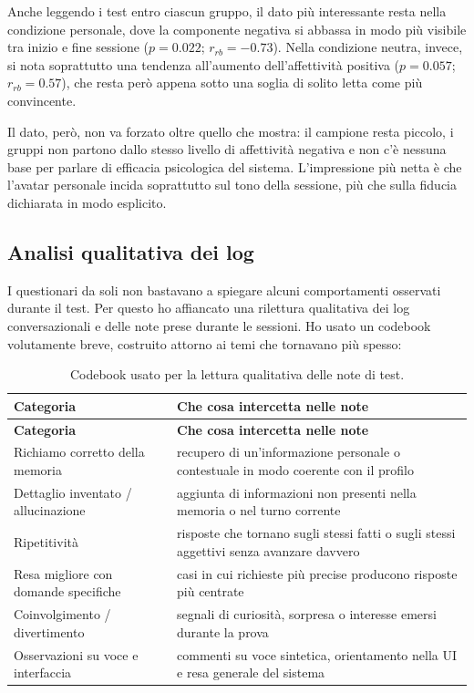 Anche leggendo i test entro ciascun gruppo, il dato più interessante resta nella condizione personale, dove la componente negativa si abbassa in modo più visibile tra inizio e fine sessione ($p = 0.022$; $r_{rb} = -0.73$). Nella condizione neutra, invece, si nota soprattutto una tendenza all'aumento dell'affettività positiva ($p = 0.057$; $r_{rb} = 0.57$), che resta però appena sotto una soglia di solito letta come più convincente.

Il dato, però, non va forzato oltre quello che mostra: il campione resta piccolo, i gruppi non partono dallo stesso livello di affettività negativa e non c'è nessuna base per parlare di efficacia psicologica del sistema. L'impressione più netta è che l'avatar personale incida soprattutto sul tono della sessione, più che sulla fiducia dichiarata in modo esplicito.

\subsection{Analisi qualitativa dei log}
\label{subsec:qualitative-logs}

I questionari da soli non bastavano a spiegare alcuni comportamenti osservati durante il test. Per questo ho affiancato una rilettura qualitativa dei log conversazionali e delle note prese durante le sessioni. Ho usato un codebook volutamente breve, costruito attorno ai temi che tornavano più spesso:

\begingroup
\small
\setlength{\tabcolsep}{6pt}
\renewcommand{\arraystretch}{1.05}
\begin{longtable}{>{\raggedright\arraybackslash}p{}>{\raggedright\arraybackslash}p{}}
\caption{Codebook usato per la lettura qualitativa delle note di test.}
\label{tab:qualitative-codebook}\\
\hline
\textbf{Categoria} & \textbf{Che cosa intercetta nelle note} \\
\hline
\endfirsthead
\hline
\textbf{Categoria} & \textbf{Che cosa intercetta nelle note} \\
\hline
\endhead
\hline
\endfoot
Richiamo corretto della memoria & recupero di un'informazione personale o contestuale in modo coerente con il profilo \\
Dettaglio inventato / allucinazione & aggiunta di informazioni non presenti nella memoria o nel turno corrente \\
Ripetitività & risposte che tornano sugli stessi fatti o sugli stessi aggettivi senza avanzare davvero \\
Resa migliore con domande specifiche & casi in cui richieste più precise producono risposte più centrate \\
Coinvolgimento / divertimento & segnali di curiosità, sorpresa o interesse emersi durante la prova \\
Osservazioni su voce e interfaccia & commenti su voce sintetica, orientamento nella UI e resa generale del sistema \\
\hline
\end{longtable}
\endgroup

